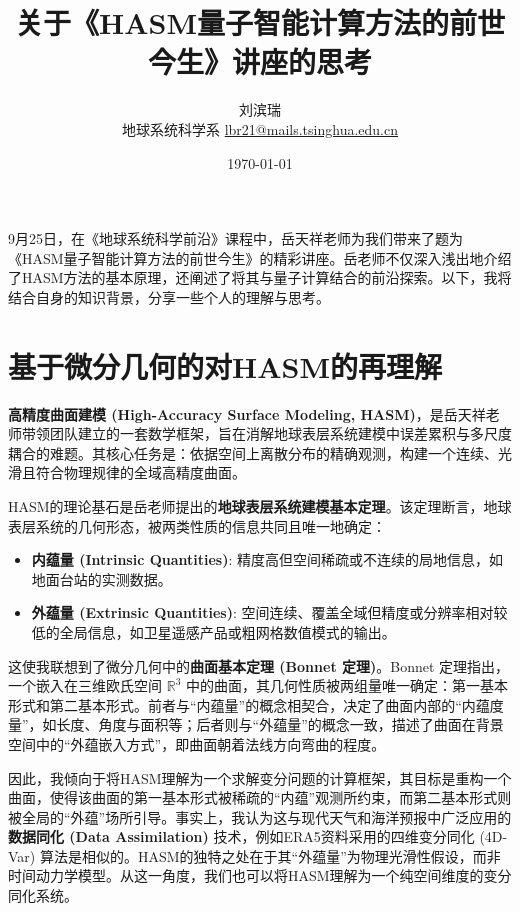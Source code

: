 \documentclass[12pt, a4paper]{article}
\title{{\Large{\textbf{关于《HASM量子智能计算方法的前世今生》讲座的思考}}}}
\author{刘滨瑞 \\ 地球系统科学系 \quad \href{mailto:lbr21@mails.tsinghua.edu.cn}{lbr21@mails.tsinghua.edu.cn}}
\date{\today}
\begin{document}
\maketitle



9月25日，在《地球系统科学前沿》课程中，岳天祥老师为我们带来了题为《HASM量子智能计算方法的前世今生》的精彩讲座。岳老师不仅深入浅出地介绍了HASM方法的基本原理，还阐述了将其与量子计算结合的前沿探索。以下，我将结合自身的知识背景，分享一些个人的理解与思考。



\section{基于微分几何的对HASM的再理解}

\textbf{高精度曲面建模 (High-Accuracy Surface Modeling, HASM)}，是岳天祥老师带领团队建立的一套数学框架，旨在消解地球表层系统建模中误差累积与多尺度耦合的难题。其核心任务是：依据空间上离散分布的精确观测，构建一个连续、光滑且符合物理规律的全域高精度曲面。

HASM的理论基石是岳老师提出的\textbf{地球表层系统建模基本定理}。该定理断言，地球表层系统的几何形态，被两类性质的信息共同且唯一地确定：
\begin{itemize}
    \item \textbf{内蕴量 (Intrinsic Quantities)}: 精度高但空间稀疏或不连续的局地信息，如地面台站的实测数据。
    \item \textbf{外蕴量 (Extrinsic Quantities)}: 空间连续、覆盖全域但精度或分辨率相对较低的全局信息，如卫星遥感产品或粗网格数值模式的输出。
\end{itemize}

这使我联想到了微分几何中的\textbf{曲面基本定理 (Bonnet 定理)}。Bonnet 定理指出，一个嵌入在三维欧氏空间 $\mathbb{R}^3$ 中的曲面，其几何性质被两组量唯一确定：第一基本形式和第二基本形式。前者与“内蕴量”的概念相契合，决定了曲面内部的“内蕴度量”，如长度、角度与面积等；后者则与“外蕴量”的概念一致，描述了曲面在背景空间中的“外蕴嵌入方式”，即曲面朝着法线方向弯曲的程度。

因此，我倾向于将HASM理解为一个求解变分问题的计算框架，其目标是重构一个曲面，使得该曲面的第一基本形式被稀疏的“内蕴”观测所约束，而第二基本形式则被全局的“外蕴”场所引导。事实上，我认为这与现代天气和海洋预报中广泛应用的\textbf{数据同化 (Data Assimilation)} 技术，例如ERA5资料采用的四维变分同化 (4D-Var) 算法是相似的。HASM的独特之处在于其“外蕴量”为物理光滑性假设，而非时间动力学模型。从这一角度，我们也可以将HASM理解为一个纯空间维度的变分同化系统。
\end{document}
